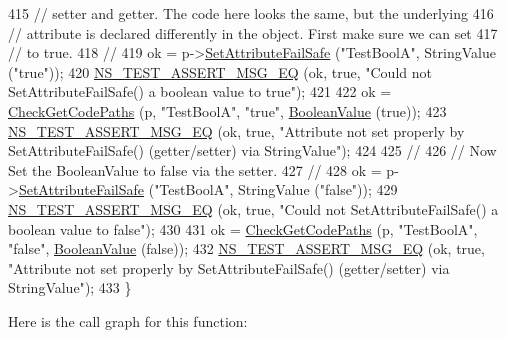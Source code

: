 \begin{DoxyCode}
415   \textcolor{comment}{// setter and getter.  The code here looks the same, but the underlying}
416   \textcolor{comment}{// attribute is declared differently in the object.  First make sure we can set}
417   \textcolor{comment}{// to true.}
418   \textcolor{comment}{//}
419   ok = p->\hyperlink{classns3_1_1ObjectBase_aa7d333004e970f925a4ed5df275541b5}{SetAttributeFailSafe} (\textcolor{stringliteral}{"TestBoolA"}, StringValue (\textcolor{stringliteral}{"true"}));
420   \hyperlink{group__testing_ga2a9d78cffb3db8e867c35fff0b698cf5}{NS\_TEST\_ASSERT\_MSG\_EQ} (ok, \textcolor{keyword}{true}, \textcolor{stringliteral}{"Could not SetAttributeFailSafe() a boolean value
       to true"});
421 
422   ok = \hyperlink{classAttributeTestCase_a902fb84c803f1c898329f9263575331e}{CheckGetCodePaths} (p, \textcolor{stringliteral}{"TestBoolA"}, \textcolor{stringliteral}{"true"}, \hyperlink{classns3_1_1BooleanValue}{BooleanValue} (\textcolor{keyword}{true}));
423   \hyperlink{group__testing_ga2a9d78cffb3db8e867c35fff0b698cf5}{NS\_TEST\_ASSERT\_MSG\_EQ} (ok, \textcolor{keyword}{true}, \textcolor{stringliteral}{"Attribute not set properly by
       SetAttributeFailSafe() (getter/setter) via StringValue"});
424 
425   \textcolor{comment}{//}
426   \textcolor{comment}{// Now Set the BooleanValue to false via the setter.}
427   \textcolor{comment}{//}
428   ok = p->\hyperlink{classns3_1_1ObjectBase_aa7d333004e970f925a4ed5df275541b5}{SetAttributeFailSafe} (\textcolor{stringliteral}{"TestBoolA"}, StringValue (\textcolor{stringliteral}{"false"}));
429   \hyperlink{group__testing_ga2a9d78cffb3db8e867c35fff0b698cf5}{NS\_TEST\_ASSERT\_MSG\_EQ} (ok, \textcolor{keyword}{true}, \textcolor{stringliteral}{"Could not SetAttributeFailSafe() a boolean value
       to false"});
430 
431   ok = \hyperlink{classAttributeTestCase_a902fb84c803f1c898329f9263575331e}{CheckGetCodePaths} (p, \textcolor{stringliteral}{"TestBoolA"}, \textcolor{stringliteral}{"false"}, \hyperlink{classns3_1_1BooleanValue}{BooleanValue} (\textcolor{keyword}{false}));
432   \hyperlink{group__testing_ga2a9d78cffb3db8e867c35fff0b698cf5}{NS\_TEST\_ASSERT\_MSG\_EQ} (ok, \textcolor{keyword}{true}, \textcolor{stringliteral}{"Attribute not set properly by
       SetAttributeFailSafe() (getter/setter) via StringValue"});
433 \}
\end{DoxyCode}


Here is the call graph for this function\+:


